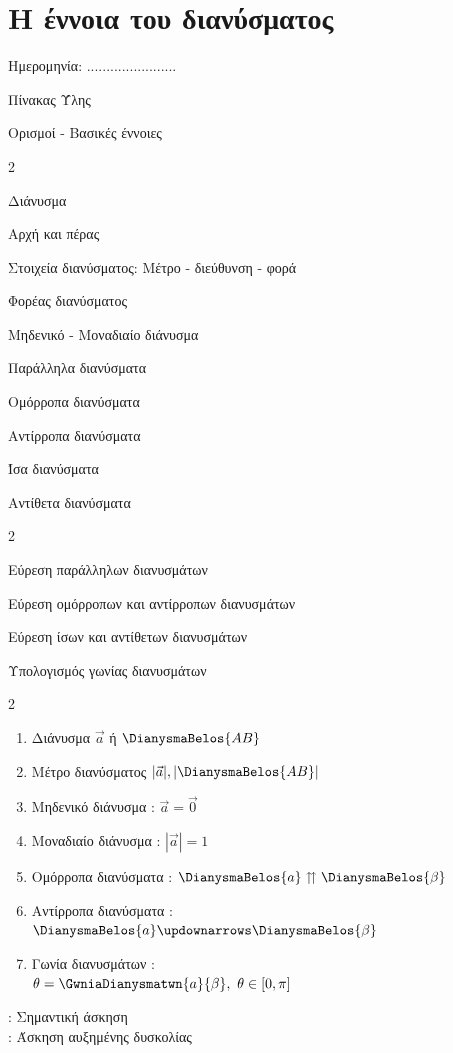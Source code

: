 \documentclass[twoside,nofonts,internet,math,spyros]{frontisthrio}
\newcommand{\myitem}{\stepcounter{enumi}\item[\raisebox{0.5mm}{\faEdit}\ \Large$\square$]}
\newcommand{\eksigisi}{
\begin{flushright}
\vfill
\faEdit: Σημαντική άσκηση\\
\faExclamationTriangle: Άσκηση αυξημένης δυσκολίας
\end{flushright}}
\begin{document}
\section{Η έννοια του διανύσματος}
\begin{flushright}
\faCalendar* Ημερομηνία: .......................
\end{flushright}
\begin{mybox}[mysubtitle]{Πίνακας Ύλης}
\begin{tcbraster}[raster columns=1,raster equal height]
\begin{myleftbox}{Ορισμοί - Βασικές έννοιες\ \ \faBook}
\begin{multicols}{2}
\begin{arithmisi}[itemsep=0mm]
\item Διάνυσμα
\item Αρχή και πέρας
\item Στοιχεία διανύσματος: Μέτρο - διεύθυνση - φορά
\item Φορέας διανύσματος
\item Μηδενικό  - Μοναδιαίο διάνυσμα
\item Παράλληλα διανύσματα
\item Ομόρροπα διανύσματα
\item Αντίρροπα διανύσματα
\item Ίσα διανύσματα
\item Αντίθετα διανύσματα
\end{arithmisi}
\end{multicols}
\end{myleftbox}
\end{tcbraster}
\begin{multicols}{2}
\begin{todolist}[itemsep=0mm]
\myitem Εύρεση παράλληλων διανυσμάτων
\item Εύρεση ομόρροπων και αντίρροπων διανυσμάτων
\item Εύρεση ίσων και αντίθετων διανυσμάτων
\item Υπολογισμός γωνίας διανυσμάτων
\end{todolist}
\end{multicols}
\begin{multicols}{2}
\begin{enumerate}[itemsep=0mm]
\item Διάνυσμα $\vec{a}$ ή $\DianysmaBelos{AB}$
\item Μέτρο διανύσματος $|\vec{a}|, |\DianysmaBelos{AB}|$
\item Μηδενικό διάνυσμα : $\vec{a}=\vec{0}$
\item Μοναδιαίο διάνυσμα : $|\vec{a}|=1$
\item Ομόρροπα διανύσματα : $\DianysmaBelos{a}\upuparrows \DianysmaBelos{\beta}$
\item Αντίρροπα διανύσματα : $\DianysmaBelos{a}\updownarrows \DianysmaBelos{\beta}$
\item Γωνία διανυσμάτων :\\
$\theta=\GwniaDianysmatwn{a}{\beta},\ \theta\in[0,\pi]$
\end{enumerate}
\end{multicols}
\end{mybox}
\eksigisi
\newpage
\end{document}
